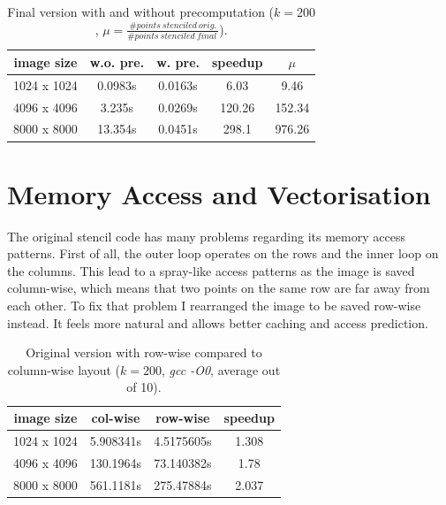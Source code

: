 \documentclass[letterpaper,twocolumn,10pt]{article}
\begin{document}
\begin{table}[ht]
	\caption{Final version with and without precomputation ($k=200$, $\mu = \frac{\#points\ stenciled\ orig.}{\#points\ stenciled\ final\ }$).}
	\begin{tabular}{c c c c c}
		image size    & w.o. pre. & w. pre. & speedup & $\mu$  \\
		\hline
		1024 x 1024 & 0.0983s  & 0.0163s & 6.03 & 9.46\\
		4096 x 4096 & 3.235s  & 0.0269s & 120.26 & 152.34\\
		8000 x 8000 & 13.354s & 0.0451s  & 298.1 & 976.26\\
	\end{tabular}
	\label{tab:prec}
\end{table}


\section*{Memory Access and Vectorisation}
The original stencil code has many problems regarding its memory access patterns.
First of all, the outer loop operates on the rows and the inner loop on the columns.
This lead to a spray-like access patterns as the image is saved column-wise, which means
that two points on the same row are far away from each other.
To fix that problem I rearranged the image to be saved row-wise instead. It feels more
natural and allows better caching and access prediction.

\begin{table}[ht]
	\caption{Original version with row-wise compared to column-wise layout ($k=200$, \textit{gcc -O0}, average out of 10).}
	\begin{tabular}{c c c c}
  		 image size  & col-wise  & row-wise    & speedup  \\
		 \hline
		 1024 x 1024 & 5.908341s & 4.5175605s  &  1.308   \\
		 4096 x 4096 & 130.1964s & 73.140382s  &  1.78    \\
		 8000 x 8000 & 561.1181s & 275.47884s  &  2.037   \\
	\end{tabular}
	\label{tab:row}
\end{table}

\end{document}
